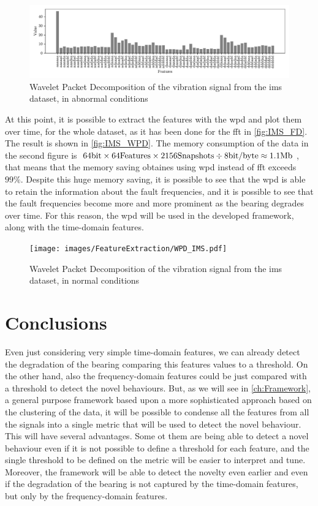 \begin{figure}[hbtp]
    \centering
    \includegraphics[width=\textwidth]{images/FeatureExtraction/IMS_WPD_fault.pdf}
    \caption{Wavelet Packet Decomposition of the  vibration signal from the \gls{ims} dataset, in abnormal conditions}
    \label{fig:IMS_WPD_fault}
\end{figure}

At this point, it is possible to extract the features with the \gls{wpd} and plot them over time, for the whole dataset, as it has been done for the \gls{fft} in \autoref{fig:IMS_FD}. The result is shown in \autoref{fig:IMS_WPD}. The memory consumption of the data in the second figure is $64 \si{\bit} \times 64 \text{Features} \times 2156 \text{Snapshots} \div 8 \text{bit/byte} \approx 1.1 \text{Mb}$, that means that the memory saving obtaines using \gls{wpd} instead of \gls{fft} exceeds $99\%$. 
Despite this huge memory saving, it is possible to see that the \gls{wpd} is able to retain the information about the fault frequencies, and it is possible to see that the fault frequencies become more and more prominent as the bearing degrades over time. For this reason, the \gls{wpd} will be used in the developed framework, along with the time-domain features.

\begin{figure}
    \centering
    \texttt{[image: images/FeatureExtraction/WPD\_IMS.pdf]}
    \caption{Wavelet Packet Decomposition of the  vibration signal from the \gls{ims} dataset, in normal conditions}
    \label{fig:IMS_WPD}
\end{figure}

\section{Conclusions}
Even just considering very simple time-domain features, we can already detect the degradation of the bearing comparing this features values to a threshold. On the other hand, also the frequency-domain features could be just compared with a threshold to detect the novel behaviours. But, as we will see in \autoref{ch:Framework}, a general purpose framework based upon a more sophisticated approach based on the clustering of the data, it will be possible to condense all the features from all the signals into a single metric that will be used to detect the novel behaviour. This will have several advantages. Some ot them are being able to detect a novel behaviour even if it is not possible to define a threshold for each feature, and the single threshold to be defined on the metric will be easier to interpret and tune. Moreover, the framework will be able to detect the novelty even earlier and even if the degradation of the bearing is not captured by the time-domain features, but only by the frequency-domain features.

